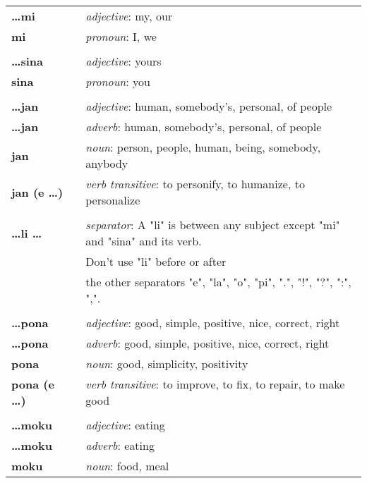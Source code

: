 \begin{supertabular}{p{2,5cm}|ll}
\textbf{\dots mi} && \textit{adjective}: my, our \\  %
\textbf{mi} && \textit{pronoun}: I, we  \\ %
 && \\ %
\textbf{\dots sina} && \textit{adjective}: yours \\  %
\textbf{sina} && \textit{pronoun}: you \\ %
 && \\ %
\textbf{\dots jan} && \textit{adjective}: human, somebody's, personal, of people \\ %
\textbf{\dots jan} && \textit{adverb}: human, somebody's, personal, of people \\ %
\textbf{jan} && \textit{noun}: person, people, human, being, somebody, anybody \\ %
\textbf{jan (e \dots)} && \textit{verb transitive}: to personify, to humanize, to personalize \\ %
 && \\ %
\textbf{\dots li \dots} && \textit{separator}: A "li" is between any subject except "mi" and "sina" and its verb. \\ && Don't use "li" before or after \\ && the other separators "e", "la", "o", "pi", ".", "!", "?", ":", ",". \\ %
 && \\ %
\textbf{\dots pona} && \textit{adjective}: good, simple, positive, nice, correct, right \\ %
\textbf{\dots pona} && \textit{adverb}: good, simple, positive, nice, correct, right \\ %
\textbf{pona} && \textit{noun}: good, simplicity, positivity \\ %
\textbf{pona (e \dots)} && \textit{verb transitive}: to improve, to fix, to repair, to make good \\ %
 && \\ %
\textbf{\dots moku} && \textit{adjective}: eating \\ %
\textbf{\dots moku} && \textit{adverb}: eating \\ %
\textbf{moku} && \textit{noun}: food, meal \\ %

\end{supertabular}
